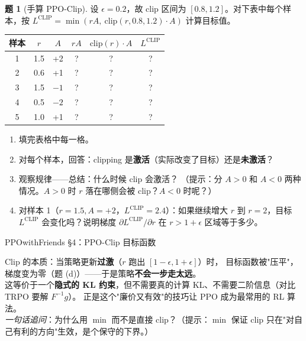 \documentclass[11pt,a4paper]{article}
\theoremstyle{definition}
\newtheorem{problem}{题}
\begin{document}
\medskip

\begin{problem}[手算 PPO-Clip]
设 $\epsilon = 0.2$，故 clip 区间为 $[0.8, 1.2]$。对下表中每个样本，按 $L^{\mathrm{CLIP}} = \min(rA,\ \mathrm{clip}(r, 0.8, 1.2) \cdot A)$ 计算目标值。

\begin{center}
\begin{tabular}{c|c|c|c|c|c}
\toprule
样本 & $r$ & $A$ & $rA$ & $\mathrm{clip}(r) \cdot A$ & $L^{\mathrm{CLIP}}$ \\
\midrule
1 & 1.5 & +2 & ? & ? & ? \\
2 & 0.6 & +1 & ? & ? & ? \\
3 & 1.5 & $-1$ & ? & ? & ? \\
4 & 0.5 & $-2$ & ? & ? & ? \\
5 & 1.0 & +1 & ? & ? & ? \\
\bottomrule
\end{tabular}
\end{center}

\begin{enumerate}[label=(\alph*)]
    \item 填完表格中每一格。
    \item 对每个样本，回答：clipping 是\textbf{激活}（实际改变了目标）还是\textbf{未激活}？
    \item 观察规律——总结：什么时候 clip 会激活？
    （提示：分 $A > 0$ 和 $A < 0$ 两种情况。$A > 0$ 时 $r$ 落在哪侧会被 clip？$A < 0$ 时呢？）
    \item 对样本 1（$r = 1.5, A = +2$，$L^{\mathrm{CLIP}} = 2.4$）：如果继续增大 $r$ 到 $r = 2$，目标 $L^{\mathrm{CLIP}}$ 会变化吗？说明梯度 $\partial L^{\mathrm{CLIP}}/\partial r$ 在 $r > 1+\epsilon$ 区域等于多少。
\end{enumerate}
\begin{topicbox}
PPOwithFriends §4：PPO-Clip 目标函数
\end{topicbox}
\begin{takeaway}
Clip 的本质：当策略更新\textbf{过激}（$r$ 跑出 $[1-\epsilon, 1+\epsilon]$）时，
目标函数被"压平"，梯度变为零（题 (d)）——于是策略\textbf{不会一步走太远}。\\
这等价于一个\textbf{隐式的 KL 约束}，但不需要真的计算 KL、不需要二阶信息（对比 TRPO 要解 $F^{-1}g$）。
正是这个"廉价又有效"的技巧让 PPO 成为最常用的 RL 算法。\\
\textit{一句话追问}：为什么用 $\min$ 而不是直接 clip？（提示：$\min$ 保证 clip 只在"对自己有利的方向"生效，是个保守的下界。）
\end{takeaway}
\end{problem}
\end{document}
